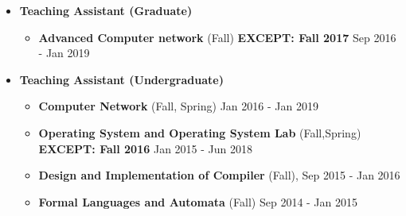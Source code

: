 \documentclass[a4paper,10pt]{article} %
\begin{document}
\begin{itemize}
	\item \textbf{Teaching Assistant (Graduate)}
	\begin{itemize}
		\item	
			\textbf{Advanced Computer network} (Fall) 
			\textbf{EXCEPT: Fall 2017} 
			\hfill {Sep 2016 - Jan 2019}
	\end{itemize}
	
	\item \textbf{Teaching Assistant (Undergraduate)}
	\begin{itemize}
		\item	
			\textbf{Computer Network} (Fall, Spring)
			\hfill {Jan 2016 - Jan 2019}
			
		\item	
			\textbf{Operating System and Operating System Lab } (Fall,Spring)
			\textbf{EXCEPT: Fall 2016} 
			\hfill {Jan 2015 - Jun 2018}
	
		\item	
			\textbf {Design and Implementation of Compiler} (Fall),
			\hfill { Sep 2015 - Jan 2016}
			
		\item
			\textbf {Formal Languages and Automata} (Fall)
			\hfill { Sep 2014 - Jan 2015}
			
	\end{itemize}

\end{itemize}
\end{document}
